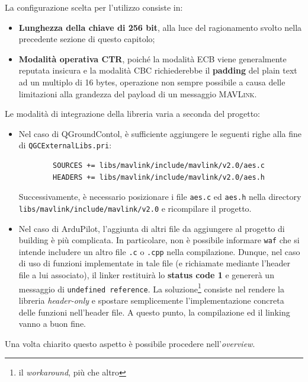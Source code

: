 \documentclass[a4paper, 12pt, oneside]{article}
\theoremstyle{definition}
\begin{document}
La configurazione scelta per l'utilizzo consiste in:

\begin{itemize}
    \item \textbf{Lunghezza della chiave di 256 bit}, alla luce del ragionamento svolto nella precedente sezione di questo capitolo;
    \item \textbf{Modalità operativa CTR}, poiché la modalità ECB viene generalmente reputata insicura e la modalità CBC richiederebbe il \textbf{padding} del plain text ad un multiplo di 16 bytes, operazione non sempre possibile a causa delle limitazioni alla grandezza del payload di un messaggio \textsc{MAVLink}.
\end{itemize}

Le modalità di integrazione della libreria varia a seconda del progetto:

\begin{itemize}
    \item Nel caso di QGroundContol, è sufficiente aggiungere le seguenti righe alla fine di \texttt{\texttt{QGCExternalLibs.pri}}:

    \begin{verbatim}
        SOURCES += libs/mavlink/include/mavlink/v2.0/aes.c
        HEADERS += libs/mavlink/include/mavlink/v2.0/aes.h
    \end{verbatim}

    Successivamente, è necessario posizionare i file \texttt{aes.c} ed \texttt{aes.h} nella directory \texttt{libs/mavlink/include/mavlink/v2.0} e ricompilare il progetto.
    \item Nel caso di ArduPilot, l'aggiunta di altri file da aggiungere al progetto di building è più complicata. 
    In particolare, non è possibile informare \texttt{waf} che si intende includere un altro file \texttt{.c} o \texttt{.cpp} nella compilazione. Dunque, nel caso di uso di funzioni implementate in tale file (e richiamate mediante l'header file a lui associato), il linker restituirà lo \textbf{status code 1} e genererà un messaggio di \texttt{undefined reference}. 
    La soluzione\footnote{il \textit{workaround}, più che altro} consiste nel rendere la libreria \textit{header-only} e spostare semplicemente l'implementazione concreta delle funzioni nell'header file. A questo punto, la compilazione ed il linking vanno a buon fine.
\end{itemize}

Una volta chiarito questo aspetto è possibile procedere nell'\textit{overview}.
\end{document}
